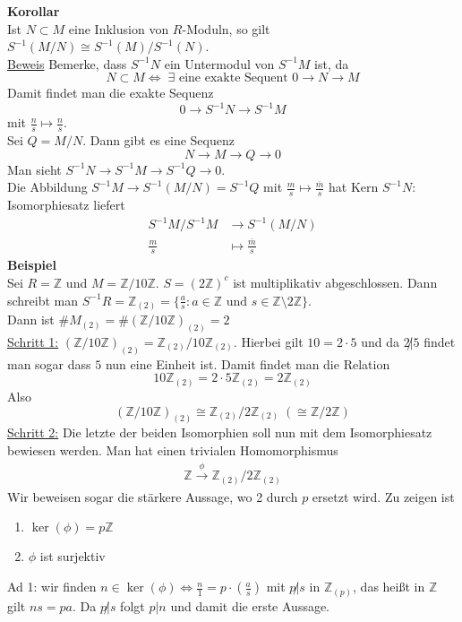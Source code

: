 \documentclass[a4paper, 12pt]{article}
\begin{document}
\textbf{Korollar}\\
Ist $N \subset M$ eine Inklusion von $R$-Moduln, so gilt $S^{-1}(M/N) \cong S^{-1}(M) / S^{-1}(N)$.\\
\underline{Beweis} Bemerke, dass $S^{-1}N$ ein Untermodul von $S^{-1}M$ ist, da \[N\subset M \Leftrightarrow \; \exists \text{ eine exakte Sequent } 0 \to N \to M\]
Damit findet man die exakte Sequenz \[0 \to S^{-1}N \to S^{-1}M\] mit $\frac{n}{s} \mapsto \frac{n}{s}$.\\
Sei $Q = M/N$. Dann gibt es eine Sequenz \[N \to M \to Q \to 0\]
Man sieht $S^{-1}N \to S^{-1}M \to S^{-1}Q \to 0$.\\
Die Abbildung $S^{-1}M \to S^{-1}(M/N) = S^{-1}Q$ mit $\frac{m}{s} \mapsto \frac{\overline{m}}{s}$ hat Kern $S^{-1}N$: Isomorphiesatz liefert \begin{align*}
	S^{-1}M/S^{-1}M &\to S^{-1}(M/N)\\
	\frac{m}{s} &\mapsto \frac{\overline{m}}{s}
\end{align*}
\textbf{Beispiel}\\
Sei $R = \mathbb{Z}$ und $M = \mathbb{Z}/10\mathbb{Z}$. $S = (2\mathbb{Z})^c$ ist multiplikativ abgeschlossen. Dann schreibt man $S^{-1}R = \mathbb{Z}_{(2)} = \{\frac{a}{s}: a \in \mathbb{Z} \text{ und } s \in \mathbb{Z}\setminus 2\mathbb{Z}\}$.\\
Dann ist $\# M_{(2)} = \#(\mathbb{Z}/10\mathbb{Z})_{(2)} = 2$\\
\underline{Schritt 1:} $(\mathbb{Z}/10\mathbb{Z})_{(2)} = \mathbb{Z}_{(2)}/10\mathbb{Z}_{(2)}$. Hierbei gilt $10 = 2\cdot 5$ und da $2\not | 5$ findet man sogar dass $5$ nun eine Einheit ist. Damit findet man die Relation \[10\mathbb{Z}_{(2)} = 2\cdot 5 \mathbb{Z}_{(2)} = 2\mathbb{Z}_{(2)}\]
Also \[(\mathbb{Z}/10\mathbb{Z})_{(2)} \cong \mathbb{Z}_{(2)}/2\mathbb{Z}_{(2)} \;(\cong \mathbb{Z}/2\mathbb{Z})\]
\underline{Schritt 2:} Die letzte der beiden Isomorphien soll nun mit dem Isomorphiesatz bewiesen werden. Man hat einen trivialen Homomorphismus \begin{align*}
	\mathbb{Z} \overset{\phi}{\to} \mathbb{Z}_{(2)}/2\mathbb{Z}_{(2)}
\end{align*}
Wir beweisen sogar die stärkere Aussage, wo 2 durch $p$ ersetzt wird. Zu zeigen ist \begin{enumerate}
	\item $\ker(\phi) = p\mathbb{Z}$
	\item $\phi$ ist surjektiv
\end{enumerate}
Ad 1: wir finden $n \in \ker(\phi) \Leftrightarrow \frac{n}{1} = p\cdot (\frac{a}{s})$ mit $p \not | s$ in $\mathbb{Z}_{(p)}$, das heißt in $\mathbb{Z}$ gilt $ns = pa$. Da $p \not | s$ folgt $p | n$ und damit die erste Aussage.\\
\end{document}
